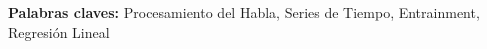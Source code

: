 \chapter*{\runtitulo}



\bigskip

\noindent\textbf{Palabras claves:} Procesamiento del Habla, Series de Tiempo, Entrainment, Regresión Lineal
